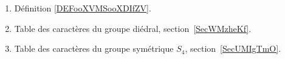 
	\label{THEMEooTheorieRepresentations}
\begin{enumerate}
	\item Définition \ref{DEFooXVMSooXDIfZV}.
	\item Table des caractères du groupe diédral, section~\ref{SecWMzheKf}.
	\item Table des caractères du groupe symétrique \( S_4\), section~\ref{SecUMIgTmO}.
\end{enumerate}
